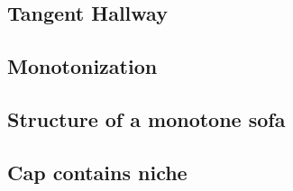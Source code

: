 
\subsection{Tangent Hallway}
\label{sec:tangent-hallway}


\subsection{Monotonization}
\label{sec:monotonization}


\subsection{Structure of a monotone sofa}
\label{sec:structure-of-a-monotone-sofa}


\subsection{Cap contains niche}
\label{sec:cap-contains-niche}


